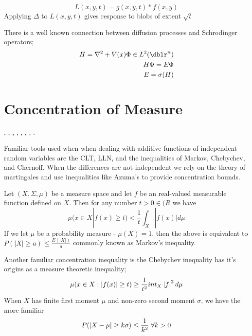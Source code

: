 \begin{equation*}
  L(x,y,t) =g(x,y,t) \ast f(x,y)
\end{equation*}
Applying $\Delta$ to $L(x,y,t)$ gives response to blobs of extent $\sqrt{t}$

There is a well known connection between diffusion processes and Schrodinger operators;
\begin{eqnarray*}
H = \nabla^2 + V(x) \Phi \in L^2(\dblr^n) \\
H \Phi = E \Phi \\
E = \sigma(H)
\end{eqnarray*}



\section{Concentration of Measure}
 \cite{MCArora04expanderflows}, \cite{MCBartlett03convexity}, \cite{MCBoucheron04concentrationinequalities},
 \cite{MCFRIEDMAN96computingbetti}, \cite{MCLedoux04spectralgap}, \cite{MCMuyan_ablessing},
 \cite{MCSinclair92improvedbounds}, \cite{MCTalagrand95concentrationof}.

Familiar tools used when when dealing with additive functions of independent random variables are the CLT, LLN, and the inequalities of Markov, Chebychev, and Chernoff.  When the differences are not independent we rely on the theory of martingales and use inequalities like Azuma's to provide concentration bounds.

Let $(X,\Sigma,\mu)$ be a measure space and let $f$ be an  real-valued measurable function defined on $X$. Then for any number $t > 0 \in \mathbb({R}$ we have
\begin{equation*}
\mu(x \in X | f(x) \geq t) < \frac{1}{t} \int_X |f(x)| d \mu
\end{equation*} If we let $\mu$ be a probability measure - $\mu(X)=1$, then the above is equivalent to $P(|X| \geq a) \leq \frac{E(|X|)}{a}$ commonly known as Markov's inequality.

Another familiar concentration inequality is the Chebychev inequality has it's origins as a measure theoretic inequality;
\begin{equation*}
\mu({x \in X : \left\vert f(x)\right\vert \geq t}) \geq \frac{1}{t^2}
int_X \left\vert f\right\vert^2 d\mu
\end{equation*} When $X$ has finite first moment $\mu$ and non-zero second moment $\sigma$, we have the more familiar
\begin{equation*}
P( \left\vert X - \mu\right\vert \geq k \sigma ) \leq \frac{1}{k^2} \; \forall k > 0
\end{equation*}


